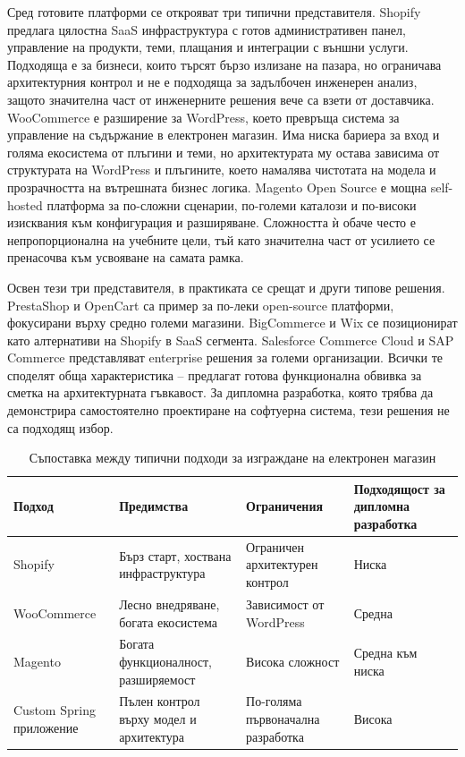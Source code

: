 Сред готовите платформи се открояват три типични представителя. Shopify \cite{shopify} предлага цялостна SaaS инфраструктура с готов административен панел, управление на продукти, теми, плащания и интеграции с външни услуги. Подходяща е за бизнеси, които търсят бързо излизане на пазара, но ограничава архитектурния контрол и не е подходяща за задълбочен инженерен анализ, защото значителна част от инженерните решения вече са взети от доставчика. WooCommerce \cite{woocommerce} е разширение за WordPress, което превръща система за управление на съдържание в електронен магазин. Има ниска бариера за вход и голяма екосистема от плъгини и теми, но архитектурата му остава зависима от структурата на WordPress и плъгините, което намалява чистотата на модела и прозрачността на вътрешната бизнес логика. Magento Open Source \cite{magento} е мощна self-hosted платформа за по-сложни сценарии, по-големи каталози и по-високи изисквания към конфигурация и разширяване. Сложността ѝ обаче често е непропорционална на учебните цели, тъй като значителна част от усилието се пренасочва към усвояване на самата рамка.

Освен тези три представителя, в практиката се срещат и други типове решения. PrestaShop и OpenCart са пример за по-леки open-source платформи, фокусирани върху средно големи магазини. BigCommerce и Wix се позиционират като алтернативи на Shopify в SaaS сегмента. Salesforce Commerce Cloud и SAP Commerce представляват enterprise решения за големи организации. Всички те споделят обща характеристика -- предлагат готова функционална обвивка за сметка на архитектурната гъвкавост. За дипломна разработка, която трябва да демонстрира самостоятелно проектиране на софтуерна система, тези решения не са подходящ избор.

\begin{table}[H]
    \centering
    \caption{Съпоставка между типични подходи за изграждане на електронен магазин}
    \label{tab:ecommerce-platforms}
    \begin{tabularx}{\textwidth}{L{2.7cm}YYY}
        \toprule
        Подход & Предимства & Ограничения & Подходящост за дипломна разработка \\
        \midrule
        Shopify & Бърз старт, хоствана инфраструктура & Ограничен архитектурен контрол & Ниска \\
        WooCommerce & Лесно внедряване, богата екосистема & Зависимост от WordPress & Средна \\
        Magento & Богата функционалност, разширяемост & Висока сложност & Средна към ниска \\
        Custom Spring приложение & Пълен контрол върху модел и архитектура & По-голяма първоначална разработка & Висока \\
        \bottomrule
    \end{tabularx}
\end{table}

